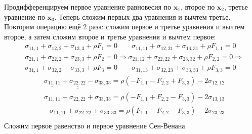 Продифференцируем первое уравнение равновесия по $\boldsymbol{x}_1$, второе по $\boldsymbol{x}_2$, третье уравнение по $\boldsymbol{x}_3$. Теперь сложим первых два уравнения и вычтем третье. Повторим операцию ещё 2 раза: сложим первое и третье уравнения и вычтем второе, а затем сложим второе и третье уравнения и вычтем первое:
$$
\begin{aligned}
& \sigma_{11,1}+\sigma_{12,2}+\sigma_{13,3}+\rho F_1=0 \quad \quad \sigma_{11,11}+\sigma_{12,21}+\sigma_{13,31}+\rho F_{1,1}=0 \quad \\
& \sigma_{21,1}+\sigma_{22,2}+\sigma_{23,3}+\rho F_2=0 \Rightarrow \sigma_{21,12}+\sigma_{22,22}+\sigma_{23,32}+\rho F_{2,2}=0 \Rightarrow \\
& \sigma_{31,1}+\sigma_{32,2}+\sigma_{33,3}+\rho F_3=0 \quad \quad \sigma_{31,13}+\sigma_{32,23}+\sigma_{33,33}+\rho F_{3,3}=0 \quad 
\end{aligned}
$$
$$
\begin{aligned}
&\underline{\sigma_{11,11}}+\underline{\underline{\sigma_{22,22}}}-\sigma_{33,33}=\rho\left(-F_{1,1}-F_{2,2}+F_{3,3}\right)-2 \sigma_{12,12} \\
&\sigma_{11,11}-\sigma_{22,22}+\sigma_{33,33}=\rho\left(-F_{1,1}+F_{2,2}-F_{3,3}\right)-2 \sigma_{13,13} \\
& -\sigma_{11,11}+\sigma_{22,22}+\sigma_{33,33}=\rho\left(F_{1,1}-F_{2,2}-F_{3,3}\right)-2 \sigma_{23,23} \\
&
\end{aligned}
$$
Сложим первое равенство и первое уравнение Сен-Венана 


